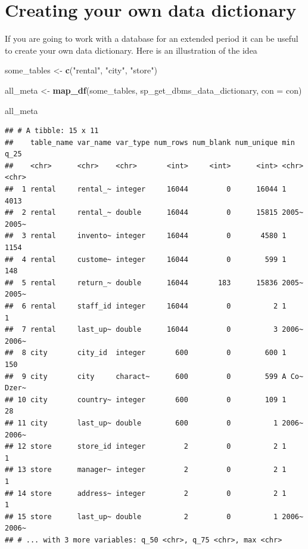 \documentclass[]{book}
\newenvironment{Shaded}{\begin{snugshade}}{\end{snugshade}}
\newcommand{\DataTypeTok}[1]{\textcolor[rgb]{0.13,0.29,0.53}{#1}}
\newcommand{\KeywordTok}[1]{\textcolor[rgb]{0.13,0.29,0.53}{\textbf{#1}}}
\newcommand{\NormalTok}[1]{#1}
\newcommand{\StringTok}[1]{\textcolor[rgb]{0.31,0.60,0.02}{#1}}
\theoremstyle{definition}
\theoremstyle{definition}
\theoremstyle{definition}
\theoremstyle{remark}
\begin{document}
\hypertarget{creating-your-own-data-dictionary}{%
\section{Creating your own data
dictionary}\label{creating-your-own-data-dictionary}}

If you are going to work with a database for an extended period it can
be useful to create your own data dictionary. Here is an illustration of
the idea

\begin{Shaded}
\begin{Highlighting}[]
\NormalTok{some_tables <-}\StringTok{ }\KeywordTok{c}\NormalTok{(}\StringTok{"rental"}\NormalTok{, }\StringTok{"city"}\NormalTok{, }\StringTok{"store"}\NormalTok{)}

\NormalTok{all_meta <-}\StringTok{ }\KeywordTok{map_df}\NormalTok{(some_tables, sp_get_dbms_data_dictionary, }\DataTypeTok{con =}\NormalTok{ con)}

\NormalTok{all_meta}
\end{Highlighting}
\end{Shaded}

\begin{verbatim}
## # A tibble: 15 x 11
##    table_name var_name var_type num_rows num_blank num_unique min   q_25 
##    <chr>      <chr>    <chr>       <int>     <int>      <int> <chr> <chr>
##  1 rental     rental_~ integer     16044         0      16044 1     4013 
##  2 rental     rental_~ double      16044         0      15815 2005~ 2005~
##  3 rental     invento~ integer     16044         0       4580 1     1154 
##  4 rental     custome~ integer     16044         0        599 1     148  
##  5 rental     return_~ double      16044       183      15836 2005~ 2005~
##  6 rental     staff_id integer     16044         0          2 1     1    
##  7 rental     last_up~ double      16044         0          3 2006~ 2006~
##  8 city       city_id  integer       600         0        600 1     150  
##  9 city       city     charact~      600         0        599 A Co~ Dzer~
## 10 city       country~ integer       600         0        109 1     28   
## 11 city       last_up~ double        600         0          1 2006~ 2006~
## 12 store      store_id integer         2         0          2 1     1    
## 13 store      manager~ integer         2         0          2 1     1    
## 14 store      address~ integer         2         0          2 1     1    
## 15 store      last_up~ double          2         0          1 2006~ 2006~
## # ... with 3 more variables: q_50 <chr>, q_75 <chr>, max <chr>
\end{verbatim}
\end{document}
